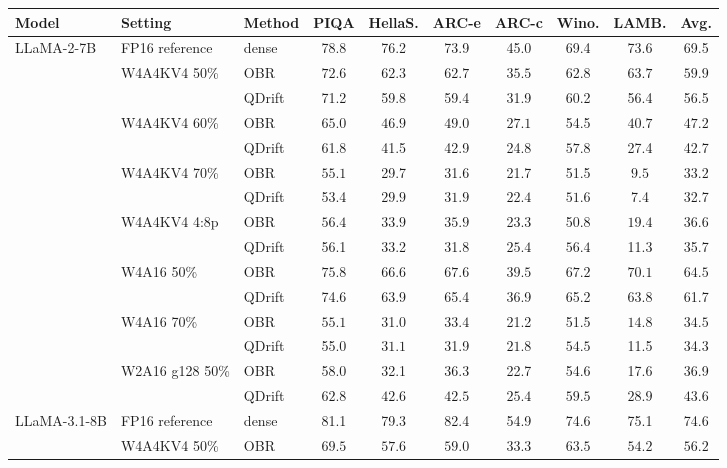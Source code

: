\begin{tabular}{lllccccccc}
\toprule
Model & Setting & Method & PIQA & HellaS. & ARC-e & ARC-c & Wino. & LAMB. & Avg. \\
\midrule
LLaMA-2-7B & FP16 reference & dense & 78.8 & 76.2 & 73.9 & 45.0 & 69.4 & 73.6 & 69.5 \\
 & W4A4KV4 50\% & OBR & $\mathbf{72.6}$ & $\mathbf{62.3}$ & $\mathbf{62.7}$ & $\mathbf{35.5}$ & $\mathbf{62.8}$ & $\mathbf{63.7}$ & $\mathbf{59.9}$ \\
 &  & QDrift & 71.2 & 59.8 & 59.4 & 31.9 & 60.2 & 56.4 & 56.5 \\
 & W4A4KV4 60\% & OBR & $\mathbf{65.0}$ & $\mathbf{46.9}$ & $\mathbf{49.0}$ & $\mathbf{27.1}$ & 54.5 & $\mathbf{40.7}$ & $\mathbf{47.2}$ \\
 &  & QDrift & 61.8 & 41.5 & 42.9 & 24.8 & $\mathbf{57.8}$ & 27.4 & 42.7 \\
 & W4A4KV4 70\% & OBR & $\mathbf{55.1}$ & 29.7 & 31.6 & 21.7 & 51.5 & $\mathbf{9.5}$ & $\mathbf{33.2}$ \\
 &  & QDrift & 53.4 & $\mathbf{29.9}$ & $\mathbf{31.9}$ & $\mathbf{22.4}$ & $\mathbf{51.6}$ & 7.4 & 32.7 \\
 & W4A4KV4 4:8p & OBR & $\mathbf{56.4}$ & $\mathbf{33.9}$ & $\mathbf{35.9}$ & 23.3 & 50.8 & $\mathbf{19.4}$ & $\mathbf{36.6}$ \\
 &  & QDrift & 56.1 & 33.2 & 31.8 & $\mathbf{25.4}$ & $\mathbf{56.4}$ & 11.3 & 35.7 \\
 & W4A16 50\% & OBR & $\mathbf{75.8}$ & $\mathbf{66.6}$ & $\mathbf{67.6}$ & $\mathbf{39.5}$ & $\mathbf{67.2}$ & $\mathbf{70.1}$ & $\mathbf{64.5}$ \\
 &  & QDrift & 74.6 & 63.9 & 65.4 & 36.9 & 65.2 & 63.8 & 61.7 \\
 & W4A16 70\% & OBR & $\mathbf{55.1}$ & 31.0 & $\mathbf{33.4}$ & 21.2 & 51.5 & $\mathbf{14.8}$ & $\mathbf{34.5}$ \\
 &  & QDrift & 55.0 & $\mathbf{31.1}$ & 31.9 & $\mathbf{21.8}$ & $\mathbf{54.5}$ & 11.5 & 34.3 \\
 & W2A16 g128 50\% & OBR & 58.0 & 32.1 & 36.3 & 22.7 & 54.6 & 17.6 & 36.9 \\
 &  & QDrift & $\mathbf{62.8}$ & $\mathbf{42.6}$ & $\mathbf{42.5}$ & $\mathbf{25.4}$ & $\mathbf{59.5}$ & $\mathbf{28.9}$ & $\mathbf{43.6}$ \\
\midrule
LLaMA-3.1-8B & FP16 reference & dense & 81.1 & 79.3 & 82.4 & 54.9 & 74.6 & 75.1 & 74.6 \\
 & W4A4KV4 50\% & OBR & $\mathbf{69.5}$ & $\mathbf{57.6}$ & $\mathbf{59.0}$ & $\mathbf{33.3}$ & $\mathbf{63.5}$ & $\mathbf{54.2}$ & $\mathbf{56.2}$ \\

\end{tabular}
